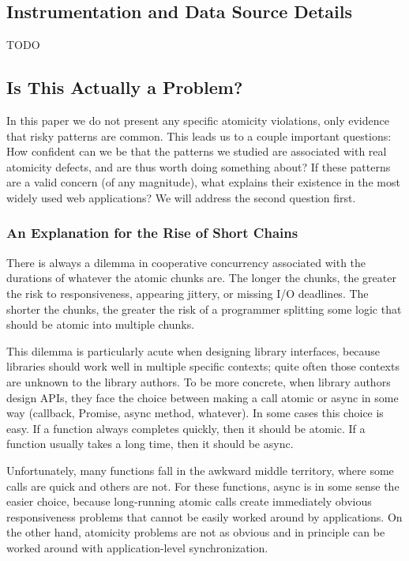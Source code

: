 \documentclass[acmsmall,anonymous,review]{acmart}\settopmatter{printfolios=true,printccs=false,printacmref=false}
\begin{document}
\subsection{Instrumentation and Data Source Details}

TODO

\subsection{Is This Actually a Problem?}

In this paper we do not present any specific atomicity violations, only evidence that risky patterns are common.
This leads us to a couple important questions:
How confident can we be that the patterns we studied are associated with real atomicity defects, and are thus worth doing something about?
If these patterns are a valid concern (of any magnitude), what explains their existence in the most widely used web applications?
We will address the second question first.

\subsubsection{An Explanation for the Rise of Short Chains}

There is always a dilemma in cooperative concurrency associated with the durations of whatever the atomic chunks are.
The longer the chunks, the greater the risk to responsiveness, appearing jittery, or missing I/O deadlines.
The shorter the chunks, the greater the risk of a programmer splitting some logic that should be atomic into multiple chunks.

This dilemma is particularly acute when designing library interfaces, because libraries should work well in multiple specific contexts; quite often those contexts are unknown to the library authors.
To be more concrete, when library authors design APIs, they face the choice between making a call atomic or async in some way (callback, Promise, async method, whatever).
In some cases this choice is easy.
If a function always completes quickly, then it should be atomic.
If a function usually takes a long time, then it should be async.

Unfortunately, many functions fall in the awkward middle territory, where some calls are quick and others are not.
For these functions, async is in some sense the easier choice, because long-running atomic calls create immediately obvious responsiveness problems that cannot be easily worked around by applications.
On the other hand, atomicity problems are not as obvious and in principle can be worked around with application-level synchronization.
\end{document}
